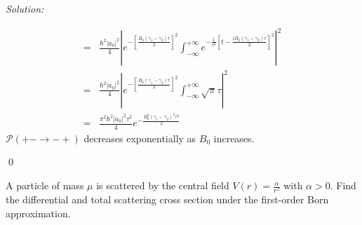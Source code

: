 \documentclass[10pt,a4paper]{article}
\newenvironment{problem}[2][Problem]{\begin{trivlist}
\item[\hskip \labelsep {\bfseries #1}\hskip \labelsep {\bfseries #2.}]}{\end{trivlist}}
\newenvironment{sol}
    {\emph{Solution:}
    }
    {
    \qed
    }
\begin{document}
\begin{sol}
\begin{itemize}
\begin{align}
\nonumber=&\frac{\hbar^2|a_0|^2}{4}\left|e^{-\left[\frac{B_0(\gamma_1-\gamma_2)\tau}{2}\right]^2}\int_{-\infty}^{+\infty}e^{-\frac{1}{\tau^2}\left[t-\frac{iB_0(\gamma_1-\gamma_2)\tau}{2}\right]^2}\right|^2\\
\nonumber=&\frac{\hbar^2|a_0|^2}{4}\left|e^{-\left[\frac{B_0(\gamma_1-\gamma_2)\tau}{2}\right]^2}\int_{-\infty}^{+\infty}\sqrt{\pi}\tau\right|^2\\
=&\frac{\pi^2\hbar^2|a_0|^2\tau^2}{4}e^{-\frac{B_0^2(\gamma_1-\gamma_2)^2\tau^2}{2}}
\end{align}
$\mathscr{P}(+-\rightarrow-+)$ decreases exponentially as $B_0$ increases.
\end{itemize}
\end{sol}

\begin{problem}{3}
A particle of mass $\mu$ is scattered by the central field $V(r)=\frac{\alpha}{r^2}$ with $\alpha>0$. Find the differential and total scattering cross section under the first-order Born approximation.
\end{problem}
\end{document}
